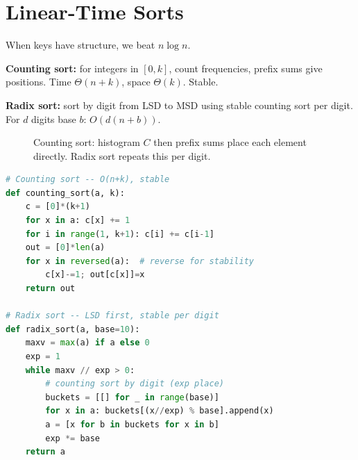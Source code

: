\section{Linear-Time Sorts}
\label{sec:linear-sorts}
When keys have structure, we beat $n\log n$.

\textbf{Counting sort:} for integers in $[0,k]$, count frequencies, prefix sums give positions. Time $\Theta(n+k)$, space $\Theta(k)$. Stable.

\textbf{Radix sort:} sort by digit from LSD to MSD using stable counting sort per digit. For $d$ digits base $b$: $O(d(n+b))$.

\begin{figure}[h]
\centering
{}
\caption{Counting sort: histogram $C$ then prefix sums place each element directly. Radix sort repeats this per digit.}
\label{fig:counting-sort}
\end{figure}

\begin{lstlisting}[language=Python]
# Counting sort -- O(n+k), stable
def counting_sort(a, k):
    c = [0]*(k+1)
    for x in a: c[x] += 1
    for i in range(1, k+1): c[i] += c[i-1]
    out = [0]*len(a)
    for x in reversed(a):  # reverse for stability
        c[x]-=1; out[c[x]]=x
    return out

# Radix sort -- LSD first, stable per digit
def radix_sort(a, base=10):
    maxv = max(a) if a else 0
    exp = 1
    while maxv // exp > 0:
        # counting sort by digit (exp place)
        buckets = [[] for _ in range(base)]
        for x in a: buckets[(x//exp) % base].append(x)
        a = [x for b in buckets for x in b]
        exp *= base
    return a
\end{lstlisting}

